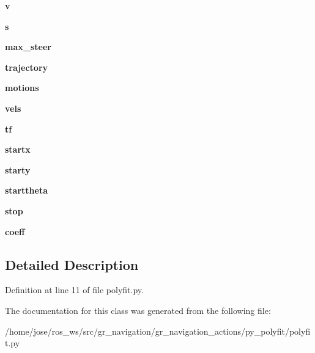 \begin{DoxyCompactItemize}
\mbox{\label{classpolyfit_1_1Action_a31a85e33dc4b9f97c787fdfc6ddc0c62}} 
{\bfseries v}
\item 
\mbox{\label{classpolyfit_1_1Action_a6650ff92c0ea1b4a8415a286ee3f82da}} 
{\bfseries s}
\item 
\mbox{\label{classpolyfit_1_1Action_a3d0f51fc52f5ea8e438508f89ecaa6e2}} 
{\bfseries max\+\_\+steer}
\item 
\mbox{\label{classpolyfit_1_1Action_ada151e541c2bc5fc9595e0e7c917cd39}} 
{\bfseries trajectory}
\item 
\mbox{\label{classpolyfit_1_1Action_adc9cb4072749085ee4bd0eebd1a4c02f}} 
{\bfseries motions}
\item 
\mbox{\label{classpolyfit_1_1Action_ad58111eb7225e3f64c4b259ac8778dd3}} 
{\bfseries vels}
\item 
\mbox{\label{classpolyfit_1_1Action_ad8095ca3ac8f39cdd95241ab2322910a}} 
{\bfseries tf}
\item 
\mbox{\label{classpolyfit_1_1Action_aca7065e37dc526ded2e710c1ab6c4ddc}} 
{\bfseries startx}
\item 
\mbox{\label{classpolyfit_1_1Action_a55565fd9083515b8c36e1ec0849cef1f}} 
{\bfseries starty}
\item 
\mbox{\label{classpolyfit_1_1Action_a5267446cb70cf144aab5230f6bcba5d5}} 
{\bfseries starttheta}
\item 
\mbox{\label{classpolyfit_1_1Action_a06057a6d211f09f1dd9237d14dfa5973}} 
{\bfseries stop}
\item 
\mbox{\label{classpolyfit_1_1Action_a5dadb12886965f5fd51318d84720204f}} 
{\bfseries coeff}
\end{DoxyCompactItemize}


\subsection{Detailed Description}


Definition at line 11 of file polyfit.\+py.



The documentation for this class was generated from the following file\+:\begin{DoxyCompactItemize}
\item 
/home/jose/ros\+\_\+ws/src/gr\+\_\+navigation/gr\+\_\+navigation\+\_\+actions/py\+\_\+polyfit/polyfit.\+py\end{DoxyCompactItemize}
